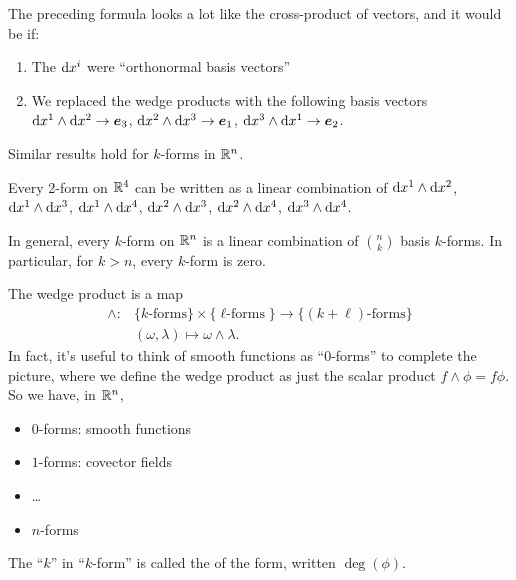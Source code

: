 \begin{remark}
The preceding formula looks a lot like the cross-product of vectors, and
it would be if:
\begin{enumerate}
\item The $\mathrm{d} x^{i}$ were ``orthonormal basis vectors''
\item We replaced the wedge products with the following basis vectors
  $\mathrm{d} x^{1}\wedge\mathrm{d} x^{2}\to\boldsymbol{e}_{3}$,
  $\mathrm{d} x^{2}\wedge\mathrm{d} x^{3}\to\boldsymbol{e}_{1}$,
  $\mathrm{d} x^{3}\wedge\mathrm{d} x^{1}\to\boldsymbol{e}_{2}$.
\end{enumerate}
\end{remark}

\begin{remark}
Similar results hold for $k$-forms in $\mathbb{R}^{n}$.
\end{remark}

\begin{example}
  Every 2-form on $\mathbb{R}^{4}$ can be written as a linear combination of
  $\mathrm{d} x^{1}\wedge\mathrm{d} x^{2}$, $\mathrm{d} x^{1}\wedge\mathrm{d} x^{3}$, $\mathrm{d} x^{1}\wedge\mathrm{d} x^{4}$, 
  $\mathrm{d} x^{2}\wedge\mathrm{d} x^{3}$, $\mathrm{d} x^{2}\wedge\mathrm{d} x^{4}$,
  $\mathrm{d} x^{3}\wedge\mathrm{d} x^{4}$. 
\end{example}

\begin{example}
In general, every $k$-form on $\mathbb{R}^{n}$ is a linear combination of
$\binom{n}{k}$ basis $k$-forms. In particular, for $k>n$, every $k$-form
is zero.
\end{example}

The wedge product is a map
\begin{equation}
  \begin{split}
\wedge\colon&\{\mbox{$k$-forms}\}\times\{\mbox{$\ell$-forms}\}\to\{\mbox{$(k+\ell)$-forms}\}\\
&(\omega,\lambda)\mapsto\omega\wedge\lambda.
  \end{split}
\end{equation}
In fact, it's useful to think of smooth functions as ``0-forms'' to
complete the picture, where we define the wedge product as just the
scalar product $f\wedge\phi=f\phi$. So we have, in $\mathbb{R}^{n}$,
\begin{itemize}
\item $0$-forms: smooth functions
\item $1$-forms: covector fields
\item \dots
\item $n$-forms
\end{itemize}
The ``$k$'' in ``$k$-form'' is called the  of the form,
written $\deg(\phi)$.

